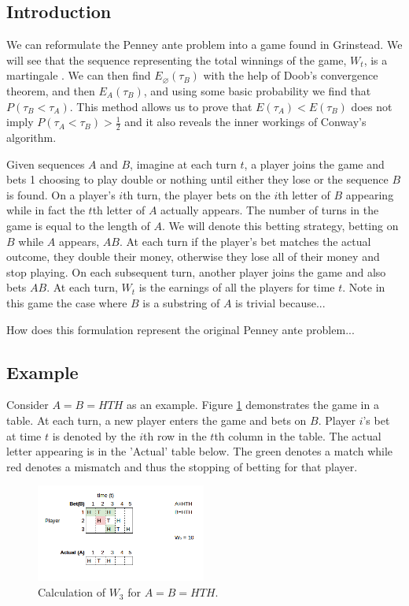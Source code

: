 \documentclass{article}
\numberwithin{mytheorem}{subsection} %
\begin{document}
		\subsection{Introduction}
		    We can reformulate the Penney ante problem into a game found in Grinstead. We will see that the sequence representing the total winnings of the game, $W_t$, is a martingale \cite{grinstead}. We can then find $E_{\varnothing}(\tau_{B})$ with the help of Doob's convergence theorem, and then $E_A(\tau_{B})$, and using some basic probability we find that $P(\tau_{B} < \tau_{A})$. This method allows us to prove that $E(\tau_A) < E(\tau_B)$ does not imply $P(\tau_A < \tau_B) > \frac{1}{2}$ and it also reveals the inner workings of Conway's algorithm. 

		    Given sequences $A$ and $B$, imagine at each turn $t$, a player joins the game and bets 1 choosing to play double or nothing until either they lose or the sequence $B$ is found. On a player's $i$th turn, the player bets on the $i$th letter of $B$ appearing while in fact the $t$th letter of $A$ actually appears. The number of turns in the game is equal to the length of $A$. We will denote this betting strategy, betting on $B$ while $A$ appears, $AB$. At each turn if the player's bet matches the actual outcome, they double their money, otherwise they lose all of their money and stop playing. On each subsequent turn, another player joins the game and also bets $AB$. At each turn, $W_t$ is the earnings of all the players for time $t$. Note in this game the case where $B$ is a substring of $A$ is trivial because... \cite{grinstead} 

		    How does this formulation represent the original Penney ante problem...

		\subsection{Example}
			Consider $A = B = HTH$ as an example. Figure \ref{fig} demonstrates the game in a table. At each turn, a new player enters the game and bets on $B$. Player $i$'s bet at time $t$ is denoted by the $i$th row in the $t$th column in the table. The actual letter appearing is in the 'Actual' table below. The green denotes a match while red denotes a mismatch and thus the stopping of betting for that player. 
			\begin{figure}[h]
				\begin{center}
					\includegraphics[width=2.2in]{Martingaletable}
				\end{center}
			
				\caption{Calculation of $W_3$ for $A = B = HTH$.}
				\label{fig}
			\end{figure}
\end{document}
